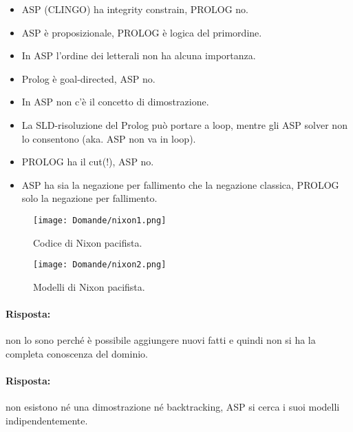 \begin{itemize}
  \item ASP (CLINGO) ha integrity constrain, PROLOG no.
  \item ASP è proposizionale, PROLOG è logica del primordine. 
\item In ASP l’ordine dei letterali non ha alcuna importanza. 
  \item Prolog è goal-directed, ASP no.
  \item In ASP non c'è il concetto di dimostrazione.
  \item La SLD-risoluzione del Prolog può portare a loop,
mentre gli ASP solver non lo consentono (aka. ASP non va in loop). 
\item PROLOG ha il cut(!), ASP no.
\item ASP ha sia la negazione per fallimento che la negazione classica, PROLOG solo la negazione per fallimento.
\end{itemize}


\begin{figure}[h]
    \centering
    \begin{minipage}{0.45\textwidth}
        \centering
        \texttt{[image: Domande/nixon1.png]}
        \caption{Codice di Nixon pacifista.}
    \end{minipage}
    \hfill
    \begin{minipage}{0.45\textwidth}
        \centering
        \texttt{[image: Domande/nixon2.png]}
        \caption{Modelli di Nixon pacifista.}
    \end{minipage}
\end{figure}



\paragraph{Risposta:} non lo sono perché è possibile aggiungere nuovi fatti e quindi non si ha la completa conoscenza del dominio.


\paragraph{Risposta:} non esistono né una dimostrazione né backtracking, ASP si cerca i suoi modelli indipendentemente.


